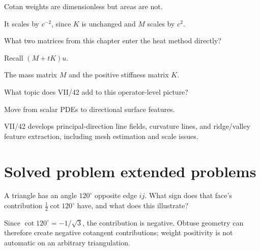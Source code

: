 \begin{hint}
Cotan weights are dimensionless but areas are not.
\end{hint}

\begin{solution}
It scales by \(c^{-2}\), since \(K\) is unchanged and \(M\) scales by \(c^2\).
\end{solution}

\begin{exercise}\label{exr:vii41-23}
What two matrices from this chapter enter the heat method directly?
\end{exercise}

\begin{hint}
Recall \((M+tK)u\).
\end{hint}

\begin{solution}
The mass matrix \(M\) and the positive stiffness matrix \(K\).
\end{solution}

\begin{exercise}\label{exr:vii41-24}
What topic does VII/42 add to this operator-level picture?
\end{exercise}

\begin{hint}
Move from scalar PDEs to directional surface features.
\end{hint}

\begin{solution}
VII/42 develops principal-direction line fields, curvature lines, and ridge/valley feature extraction, including mesh estimation and scale issues.
\end{solution}


\section{Solved problem extended problems}

\begin{problem}\label{prob:vii41-01}
A triangle has an angle \(120^\circ\) opposite edge \(ij\).  What sign does that face's contribution \(\tfrac12\cot120^\circ\) have, and what does this illustrate?
\end{problem}

\begin{solution}
Since \(\cot120^\circ=-1/\sqrt3\), the contribution is negative.  Obtuse geometry can therefore create negative cotangent contributions; weight positivity is not automatic on an arbitrary triangulation.
\end{solution}

